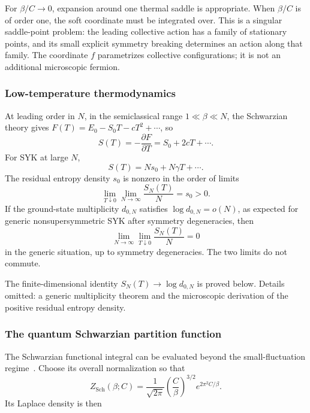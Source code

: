 \documentclass[11pt]{article}
\numberwithin{equation}{section}
\theoremstyle{exposition}
\theoremstyle{result}
\newcommand{\Sch}{\mathrm{Sch}}
\begin{document}
For $\beta/C\to0$, expansion around one thermal saddle is appropriate. When $\beta/C$ is of order one, the soft coordinate must be integrated over. This is a singular saddle-point problem: the leading collective action has a family of stationary points, and its small explicit symmetry breaking determines an action along that family. The coordinate $f$ parametrizes collective configurations; it is not an additional microscopic fermion.

\subsubsection{Low-temperature thermodynamics}

At leading order in $N$, in the semiclassical range $1\ll\beta\ll N$, the Schwarzian theory gives $F(T)=E_0-S_0T-cT^2+\cdots$, so
\begin{equation*}
S(T)=-\frac{\partial F}{\partial T}
=S_0+2cT+\cdots.
\end{equation*}
For SYK at large $N$,
\begin{equation}
S(T)=Ns_0+N\gamma T+\cdots.
\label{eq:SYKentropy}
\end{equation}
The residual entropy density $s_0$ is nonzero in the order of limits
\begin{equation*}
\lim_{T\downarrow0}\lim_{N\to\infty}\frac{S_N(T)}N=s_0>0.
\end{equation*}
If the ground-state multiplicity $d_{0,N}$ satisfies $\log d_{0,N}=o(N)$, as expected for generic nonsupersymmetric SYK after symmetry degeneracies, then
\begin{equation*}
\lim_{N\to\infty}\lim_{T\downarrow0}\frac{S_N(T)}N=0
\end{equation*}
in the generic situation, up to symmetry degeneracies. The two limits do not commute.

The finite-dimensional identity $S_N(T)\to\log d_{0,N}$ is proved below. Details omitted: a generic multiplicity theorem and the microscopic derivation of the positive residual entropy density.

\subsubsection{The quantum Schwarzian partition function}
The Schwarzian functional integral can be evaluated beyond the small-fluctuation regime~\cite{StanfordWitten}. Choose its overall normalization so that
\begin{equation}
Z_{\Sch}(\beta;C)
=\frac1{\sqrt{2\pi}}\left(\frac C\beta\right)^{3/2}
e^{2\pi^2C/\beta}.
\label{eq:SchPartition}
\end{equation}
Its Laplace density is then
\end{document}

